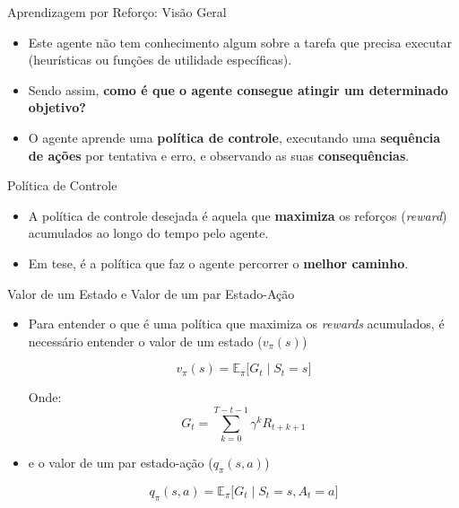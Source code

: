 \documentclass{beamer}
\begin{document}
\begin{frame}{Aprendizagem por Reforço: Visão Geral}
	\begin{itemize}
	\item<1-> Este agente não tem conhecimento algum sobre a tarefa que precisa executar (heurísticas ou funções de utilidade específicas).
	\item<2-> Sendo assim, \textbf{{\color{red}como é que o agente consegue atingir um determinado objetivo?}}
	\item<3-> O agente aprende uma \textbf{política de controle}, executando uma \textbf{sequência de ações} por tentativa e erro, e observando as suas \textbf{consequências}.
	
	\end{itemize}
\end{frame}
	



\begin{frame}{Política de Controle}
	\begin{itemize}
	\item A política de controle desejada é aquela que \textbf{maximiza} os reforços 
	(\textit{reward}) acumulados ao longo do tempo pelo 
	agente.
	\item Em tese, é a política que faz o agente percorrer o \textbf{melhor caminho}. 
	
	\end{itemize}
	
\end{frame}

\begin{frame}{Valor de um Estado e Valor de um par Estado-Ação}
	
	\begin{itemize}
		\item Para entender o que é uma política que maximiza os \textit{rewards} acumulados, é necessário entender o valor de um estado ($v_\pi(s)$) 
		
		\[
		v_\pi(s) = \mathbb{E}_\pi\big[ G_t \mid S_t=s \big]
		\]
		
		Onde: \[
		G_t = \sum_{k=0}^{T-t-1} \gamma^k R_{t+k+1}
		\]
		
		\item e o valor de um par estado-ação ($q_\pi(s,a)$)
		
		\[
		q_\pi(s,a) = \mathbb{E}_\pi\big[ G_t \mid S_t=s, A_t=a \big]
		\]
		
	\end{itemize}

\end{frame}
\end{document}
